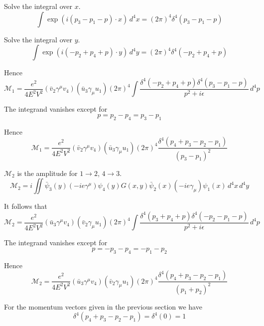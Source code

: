 Solve the integral over $x$.
\begin{equation*}
\int\exp(i(p_3-p_1-p)\cdot x)\,d^4x=(2\pi)^4\delta^4(p_3-p_1-p)
\end{equation*}

Solve the integral over $y$.
\begin{equation*}
\int\exp(i(-p_2+p_4+p)\cdot y)\,d^4y=(2\pi)^4\delta^4(-p_2+p_4+p)
\end{equation*}

Hence
\begin{equation*}
\mathcal M_1=\frac{e^2}{4E^2V^2}(\bar v_2\gamma^\mu v_4)(\bar u_3\gamma_\mu u_1)
(2\pi)^4\int
\frac{\delta^4(-p_2+p_4+p)\delta^4(p_3-p_1-p)}{p^2+i\epsilon}
\,d^4p
\end{equation*}

The integrand vanishes except for
\begin{equation*}
p=p_2-p_4=p_3-p_1
\end{equation*}

Hence
\begin{equation*}
\mathcal M_1=\frac{e^2}{4E^2V^2}(\bar v_2\gamma^\mu v_4)(\bar u_3\gamma_\mu u_1)
(2\pi)^4\frac{\delta^4(p_4+p_3-p_2-p_1)}{(p_3-p_1)^2}
\end{equation*}

$\mathcal M_2$ is the amplitude for $1\rightarrow2$, $4\rightarrow3$.
\begin{equation*}
\mathcal M_2=i\iint
\bar\psi_3(y)
(-ie\gamma^\mu)
\psi_4(y)
G(x,y)
\bar\psi_2(x)
(-ie\gamma_\mu)
\psi_1(x)
\,d^4x\,d^4y
\end{equation*}

It follows that
\begin{equation*}
\mathcal M_2=\frac{e^2}{4E^2V^2}(\bar u_3\gamma^\mu v_4)(\bar v_2\gamma_\mu u_1)
(2\pi)^4\int
\frac{\delta^4(p_3+p_4+p)\delta^4(-p_2-p_1-p)}{p^2+i\epsilon}
\,d^4p
\end{equation*}

The integrand vanishes except for
\begin{equation*}
p=-p_3-p_4=-p_1-p_2
\end{equation*}

Hence
\begin{equation*}
\mathcal M_2=\frac{e^2}{4E^2V^2}(\bar u_3\gamma^\mu v_4)(\bar v_2\gamma_\mu u_1)
(2\pi)^4\frac{\delta^4(p_4+p_3-p_2-p_1)}{(p_1+p_2)^2}
\end{equation*}

For the momentum vectors given in the previous section we have
\begin{equation*}
\delta^4(p_4+p_3-p_2-p_1)=\delta^4(0)=1
\end{equation*}

